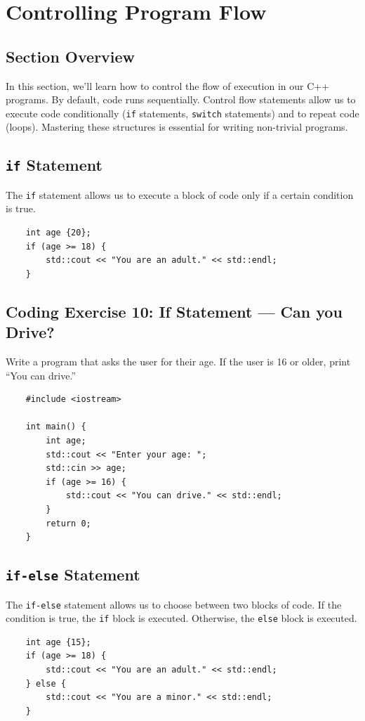 \section{Controlling Program Flow}

\subsection{Section Overview}
In this section, we'll learn how to control the flow of execution in our C++ programs. By default, code runs sequentially. Control flow statements allow us to execute code conditionally (\texttt{if} statements, \texttt{switch} statements) and to repeat code (loops). Mastering these structures is essential for writing non-trivial programs.

\subsection{\texttt{if} Statement}
The \texttt{if} statement allows us to execute a block of code only if a certain condition is true.
\begin{lstlisting}
	int age {20};
	if (age >= 18) {
		std::cout << "You are an adult." << std::endl;
	}
\end{lstlisting}

\subsection{Coding Exercise 10: If Statement --- Can you Drive?}
Write a program that asks the user for their age. If the user is 16 or older, print ``You can drive.''
\begin{lstlisting}
	#include <iostream>

	int main() {
		int age;
		std::cout << "Enter your age: ";
		std::cin >> age;
		if (age >= 16) {
			std::cout << "You can drive." << std::endl;
		}
		return 0;
	}
\end{lstlisting}

\subsection{\texttt{if-else} Statement}
The \texttt{if-else} statement allows us to choose between two blocks of code. If the condition is true, the \texttt{if} block is executed. Otherwise, the \texttt{else} block is executed.
\begin{lstlisting}
	int age {15};
	if (age >= 18) {
		std::cout << "You are an adult." << std::endl;
	} else {
		std::cout << "You are a minor." << std::endl;
	}
\end{lstlisting}

